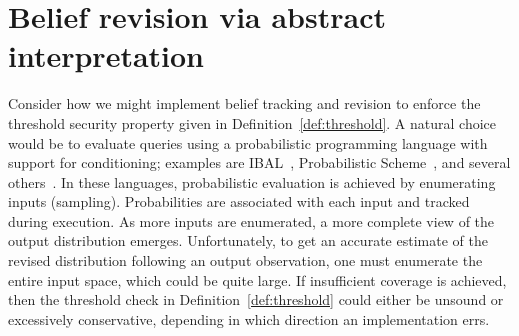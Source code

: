 \ifacita
\else




\section{Belief revision via abstract interpretation}
\label{sec:absinterp}

\setlength{\arraycolsep}{0.1cm}
\newcommand{\ajoin}[0]{\bigsqcup}


Consider how we might implement belief tracking and revision to enforce the
threshold security property given in Definition~\ref{def:threshold}.  A
natural choice would be to evaluate queries using a probabilistic
programming language with support for conditioning; examples are
IBAL~\cite{pfeffer07ibal}, Probabilistic
Scheme~\cite{radul07probscheme}, and several
others~\cite{park08sampling,goodman08church,kiselyov09embedded}.  In  
these languages, probabilistic evaluation is achieved by enumerating
inputs (sampling).  Probabilities are associated with each input and tracked during
execution.  As more inputs are enumerated, a more complete view of
the output distribution emerges.  Unfortunately,
to get an accurate estimate of the revised distribution following an output observation,
one must enumerate the
entire input space, which could be quite large.  If insufficient coverage is
achieved, then the threshold check in Definition~\ref{def:threshold} could
either be unsound or excessively conservative, depending in which direction
an implementation errs.

